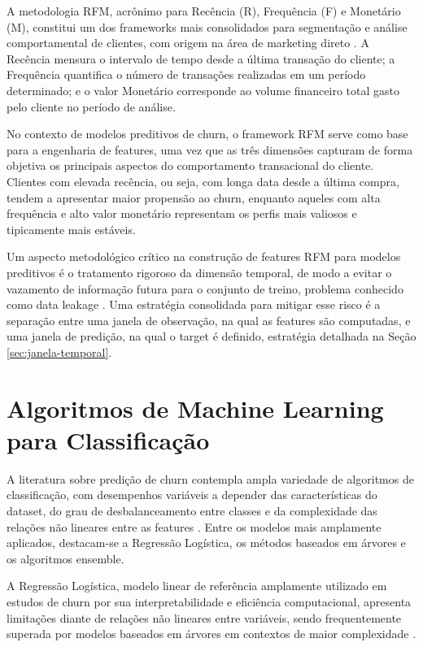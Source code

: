 A metodologia RFM, acrônimo para Recência (R), Frequência (F) e Monetário (M), constitui um dos frameworks mais consolidados para segmentação e análise comportamental de clientes, com origem na área de marketing direto \cite{hughes1994}. A Recência mensura o intervalo de tempo desde a última transação do cliente; a Frequência quantifica o número de transações realizadas em um período determinado; e o valor Monetário corresponde ao volume financeiro total gasto pelo cliente no período de análise.

No contexto de modelos preditivos de churn, o framework RFM serve como base para a engenharia de features, uma vez que as três dimensões capturam de forma objetiva os principais aspectos do comportamento transacional do cliente. Clientes com elevada recência, ou seja, com longa data desde a última compra, tendem a apresentar maior propensão ao churn, enquanto aqueles com alta frequência e alto valor monetário representam os perfis mais valiosos e tipicamente mais estáveis.

Um aspecto metodológico crítico na construção de features RFM para modelos preditivos é o tratamento rigoroso da dimensão temporal, de modo a evitar o vazamento de informação futura para o conjunto de treino, problema conhecido como data leakage \cite{kaufman2012}. Uma estratégia consolidada para mitigar esse risco é a separação entre uma janela de observação, na qual as features são computadas, e uma janela de predição, na qual o target é definido, estratégia detalhada na Seção \ref{sec:janela-temporal}.

\FloatBarrier
\section{Algoritmos de Machine Learning para Classificação} \label{sec:algoritmos}

A literatura sobre predição de churn contempla ampla variedade de algoritmos de classificação, com desempenhos variáveis a depender das características do dataset, do grau de desbalanceamento entre classes \cite{he2009} e da complexidade das relações não lineares entre as features \cite{vafeiadis2015}. Entre os modelos mais amplamente aplicados, destacam-se a Regressão Logística, os métodos baseados em árvores e os algoritmos ensemble.

A Regressão Logística, modelo linear de referência amplamente utilizado em estudos de churn por sua interpretabilidade e eficiência computacional, apresenta limitações diante de relações não lineares entre variáveis, sendo frequentemente superada por modelos baseados em árvores em contextos de maior complexidade \cite{prabadevi2023}.

